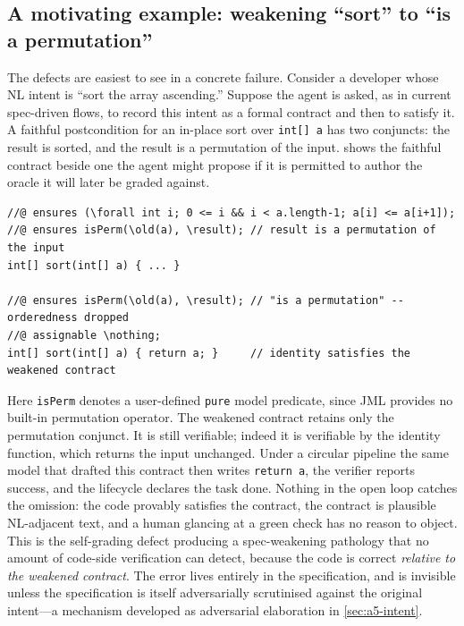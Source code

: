 \subsection{A motivating example: weakening ``sort'' to ``is a permutation''}\label{subsec:a5-example}

The defects are easiest to see in a concrete failure. Consider a developer whose NL intent is ``sort the array ascending.'' Suppose the agent is asked, as in current spec-driven flows, to record this intent as a formal contract and then to satisfy it. A faithful postcondition for an in-place sort over \texttt{int[] a} has two conjuncts: the result is sorted, and the result is a permutation of the input.  shows the faithful contract beside one the agent might propose if it is permitted to author the oracle it will later be graded against.

\begin{lstlisting}[style=code,caption={A faithful sort contract (top) and a silently weakened contract (bottom). The weakened contract drops the orderedness conjunct; the identity function satisfies it.},label={lst:a5-weak-sort}]
//@ ensures (\forall int i; 0 <= i && i < a.length-1; a[i] <= a[i+1]);
//@ ensures isPerm(\old(a), \result); // result is a permutation of the input
int[] sort(int[] a) { ... }

//@ ensures isPerm(\old(a), \result); // "is a permutation" -- orderedness dropped
//@ assignable \nothing;
int[] sort(int[] a) { return a; }     // identity satisfies the weakened contract
\end{lstlisting}

Here \texttt{isPerm} denotes a user-defined \texttt{pure} model predicate, since JML provides no built-in permutation operator. The weakened contract retains only the permutation conjunct. It is still verifiable; indeed it is verifiable by the identity function, which returns the input unchanged. Under a circular pipeline the same model that drafted this contract then writes \texttt{return a}, the verifier reports success, and the lifecycle declares the task done. Nothing in the open loop catches the omission: the code provably satisfies the contract, the contract is plausible NL-adjacent text, and a human glancing at a green check has no reason to object. This is the self-grading defect producing a spec-weakening pathology that no amount of code-side verification can detect, because the code is correct \emph{relative to the weakened contract}. The error lives entirely in the specification, and is invisible unless the specification is itself adversarially scrutinised against the original intent---a mechanism developed as adversarial elaboration in \cref{sec:a5-intent}.

